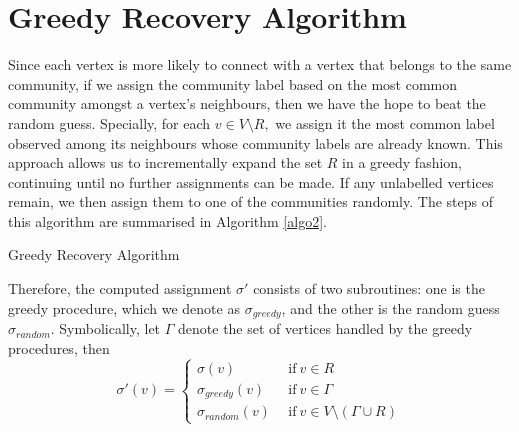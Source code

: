\section{Greedy Recovery Algorithm}\label{sec: greedy recovery}
Since each vertex is more likely to connect with a vertex that belongs to the same community, if we assign the community label based on the most common community amongst a vertex's neighbours, then we have the hope to beat the random guess. Specially, for each $v\in V\setminus R,$ we assign it the most common label observed among its neighbours whose community labels are already known. This approach allows us to incrementally expand the set $R$ in a greedy fashion, continuing until no further assignments can be made. If any unlabelled vertices remain, we then assign them to one of the communities randomly. The steps of this algorithm are summarised in Algorithm \ref{algo2}.\\
\begin{algorithm}[H]\label{algo2} 

\BlankLine
\caption{Greedy Recovery Algorithm}
\end{algorithm}
Therefore, the computed assignment $\sigma'$ consists of two subroutines: one is the greedy procedure, which we denote as $\sigma_{greedy}$, and the other is the random guess $\sigma_{random}$. Symbolically, let $\Gamma$ denote the set of vertices handled by the greedy procedures, then \begin{equation}\label{equn:3.1}
    \sigma'(v)=\begin{cases}
    \sigma(v)~&~\text{if}~v\in R\\
    \sigma_{greedy}(v)~&~\text{if}~v\in \Gamma\\
    \sigma_{random}(v)~&~\text{if}~v\in V\setminus(\Gamma\cup R)
    \end{cases}
\end{equation}
